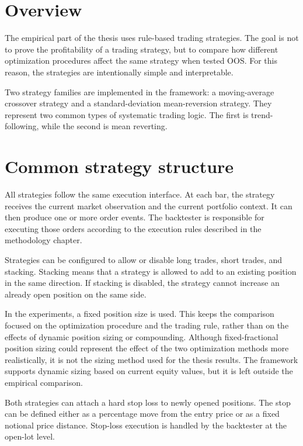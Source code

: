 \section{Overview}

The empirical part of the thesis uses rule-based trading strategies. The goal is not to prove the
profitability of a trading strategy, but to compare how different optimization procedures affect the
same strategy when tested OOS. For this reason, the strategies are intentionally simple and
interpretable.

Two strategy families are implemented in the framework: a moving-average crossover strategy and a
standard-deviation mean-reversion strategy. They represent two common types of systematic trading
logic. The first is trend-following, while the second is mean reverting.

\section{Common strategy structure}

All strategies follow the same execution interface. At each bar, the strategy receives the current
market observation and the current portfolio context. It can then produce one or more order events.
The backtester is responsible for executing those orders according to the execution rules described
in the methodology chapter.

Strategies can be configured to allow or disable long trades, short trades, and stacking. Stacking
means that a strategy is allowed to add to an existing position in the same direction. If stacking
is disabled, the strategy cannot increase an already open position on the same side.

In the experiments, a fixed position size is used. This keeps the comparison focused on the
optimization procedure and the trading rule, rather than on the effects of dynamic position sizing
or compounding. Although fixed-fractional position sizing could represent the effect of the two
optimization methods more realistically, it is not the sizing method used for the thesis results. The
framework supports dynamic sizing based on current equity values, but it is left outside the empirical
comparison.

Both strategies can attach a hard stop loss to newly opened positions. The stop can be defined
either as a percentage move from the entry price or as a fixed notional price distance. Stop-loss
execution is handled by the backtester at the open-lot level.

